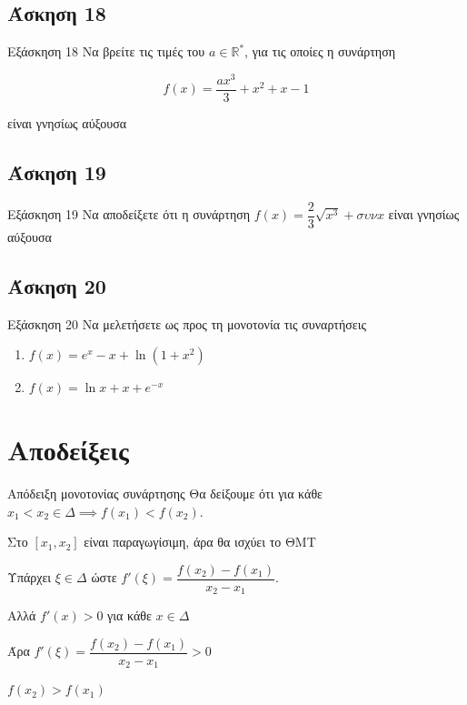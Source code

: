 \documentclass[greek]{beamer}
\begin{document}
\subsection{Άσκηση 18}
\begin{frame}[label=Άσκηση18]{Εξάσκηση 18}
  Να βρείτε τις τιμές του $a\in \mathbb{R}^*$, για τις οποίες η συνάρτηση

  $$f(x)=\dfrac{ax^3}{3}+x^2+x-1$$

  είναι γνησίως αύξουσα

\end{frame}

\subsection{Άσκηση 19}
\begin{frame}[label=Άσκηση19]{Εξάσκηση 19}
  Να αποδείξετε ότι η συνάρτηση $f(x)=\dfrac{2}{3}\sqrt{x^3}+συνx$ είναι γνησίως αύξουσα

\end{frame}

\subsection{Άσκηση 20}
\begin{frame}[label=Άσκηση20]{Εξάσκηση 20}
  Να μελετήσετε ως προς τη μονοτονία τις συναρτήσεις
  \begin{enumerate}
    \item<1-> $f(x)=e^x-x+\ln (1+x^2)$
    \item<2-> $f(x)=\ln x+x+e^{-x}$
  \end{enumerate}

\end{frame}


\appendix

\section{Αποδείξεις}
\begin{frame}[label=Απόδειξη1]{Απόδειξη μονοτονίας συνάρτησης}
 Θα δείξουμε ότι για κάθε $x_1<x_2\in Δ \implies f(x_1)<f(x_2)$.

  Στο $[x_1,x_2]$ είναι παραγωγίσιμη, άρα θα ισχύει το ΘΜΤ

  Υπάρχει $ξ\in Δ$ ώστε $f'(ξ)=\dfrac{f(x_2)-f(x_1)}{x_2-x_1}$.

  Αλλά $f'(x)>0$ για κάθε $x\in Δ$

  Άρα $f'(ξ)=\dfrac{f(x_2)-f(x_1)}{x_2-x_1}>0$

  $f(x_2)>f(x_1)$

 \hyperlink{Θεώρημα1}{}
\end{frame}
\end{document}

